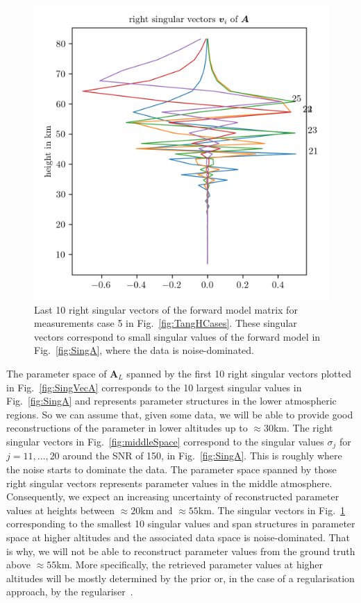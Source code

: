 \begin{figure}[ht!]
	\centering
	\includegraphics{NullVecA.png}
	\caption[Last 10 right singular vectors of forward model.]{Last 10 right singular vectors of the forward model matrix for measurements case 5 in Fig.~\ref{fig:TangHCases}. These singular vectors correspond to small singular values of the forward model in Fig.~\ref{fig:SingA}, where the data is noise-dominated.}
	\label{fig:nullSpace}
\end{figure}
The parameter space of $\bm{A}_L$ spanned by the first 10 right singular vectors plotted in Fig.~\ref{fig:SingVecA} corresponds to the 10 largest singular values in Fig.~\ref{fig:SingA} and represents parameter structures in the lower atmospheric regions.
So we can assume that, given some data, we will be able to provide good reconstructions of the parameter in lower altitudes up to $\approx30$km.
The right singular vectors in Fig.~\ref{fig:middleSpace} correspond to the singular values $\sigma_j$ for $j = 11, \dots, 20$ around the SNR of 150, in Fig.~\ref{fig:SingA}.
This is roughly where the noise starts to dominate the data.
The parameter space spanned by those right singular vectors represents parameter values in the middle atmosphere.
Consequently, we expect an increasing uncertainty of reconstructed parameter values at heights between $\approx20$km and $\approx55$km.
The singular vectors in Fig.~\ref{fig:nullSpace} corresponding to the smallest 10 singular values and span structures in parameter space at higher altitudes and the associated data space is noise-dominated.
That is why, we will not be able to reconstruct parameter values from the ground truth above $\approx55$km.
More specifically, the retrieved parameter values at higher altitudes will be mostly determined by the prior or, in the case of a regularisation approach, by the regulariser~\cite{tan2016LecNot}.

